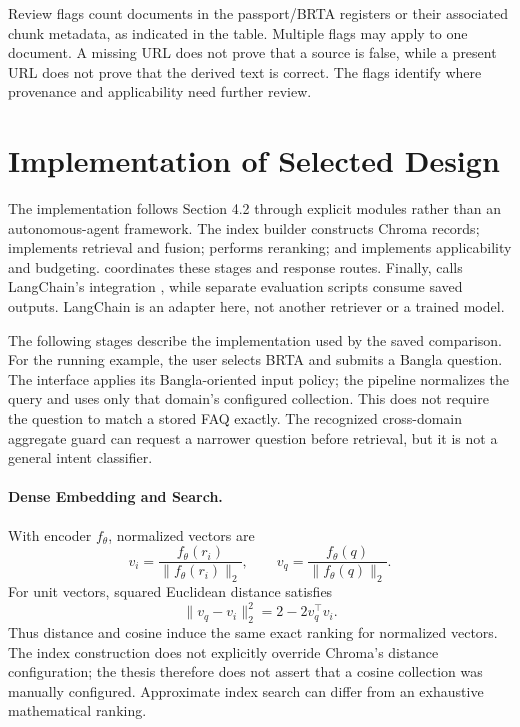
Review flags count documents in the passport/BRTA registers or their associated chunk metadata, as indicated in the table. Multiple flags may apply to one document. A missing URL does not prove that a source is false, while a present URL does not prove that the derived text is correct. The flags identify where provenance and applicability need further review.

\section{Implementation of Selected Design}
The implementation follows Section 4.2 through explicit modules rather than an autonomous-agent framework. The index builder constructs Chroma records;  implements retrieval and fusion;  performs reranking; and  implements applicability and budgeting.  coordinates these stages and response routes. Finally,  calls LangChain's  integration \cite{langchain_ollama}, while separate evaluation scripts consume saved outputs. LangChain is an adapter here, not another retriever or a trained model.

The following stages describe the implementation used by the saved comparison. For the running example, the user selects BRTA and submits a Bangla question. The interface applies its Bangla-oriented input policy; the pipeline normalizes the query and uses only that domain's configured collection. This does not require the question to match a stored FAQ exactly. The recognized cross-domain aggregate guard can request a narrower question before retrieval, but it is not a general intent classifier.

\paragraph{Dense Embedding and Search.}
With encoder $f_\theta$, normalized vectors are
\begin{equation}
v_i=\frac{f_\theta(r_i)}{\|f_\theta(r_i)\|_2},\qquad
v_q=\frac{f_\theta(q)}{\|f_\theta(q)\|_2}.
\end{equation}
For unit vectors, squared Euclidean distance satisfies
\begin{equation}
\|v_q-v_i\|_2^2=2-2v_q^\top v_i.
\end{equation}
Thus distance and cosine induce the same exact ranking for normalized vectors. The index construction does not explicitly override Chroma's distance configuration; the thesis therefore does not assert that a cosine collection was manually configured. Approximate index search can differ from an exhaustive mathematical ranking.

